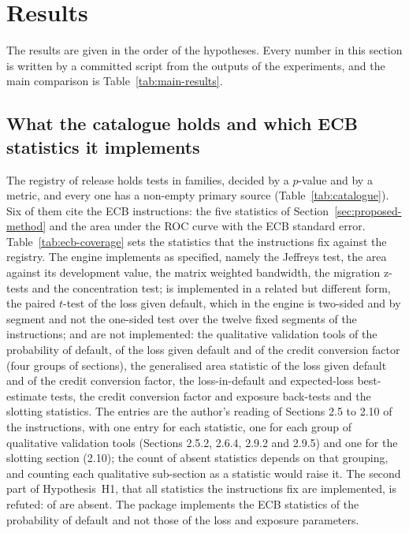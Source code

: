 \section{Results}
\label{sec:results}

The results are given in the order of the hypotheses. Every number in this section is written by a committed script from the outputs of the experiments, and the main comparison is Table~\ref{tab:main-results}.



\subsection{What the catalogue holds and which ECB statistics it implements}

The registry of release \inventoryVersion{} holds \testsTotal{} tests in \familiesTotal{} families, \pvalueTests{} decided by a $p$-value and \metricTests{} by a metric, and every one has a non-empty primary source (Table~\ref{tab:catalogue}). Six of them cite the ECB instructions: the five statistics of Section~\ref{sec:proposed-method} and the area under the ROC curve with the ECB standard error. Table~\ref{tab:ecb-coverage} sets the \ecbSections{} statistics that the instructions fix against the registry. The engine implements \ecbImpl{} as specified, namely the Jeffreys test, the area against its development value, the matrix weighted bandwidth, the migration z-tests and the concentration test; \ecbRelated{} is implemented in a related but different form, the paired $t$-test of the loss given default, which in the engine is two-sided and by segment and not the one-sided test over the twelve fixed segments of the instructions; and \ecbAbsent{} are not implemented: the qualitative validation tools of the probability of default, of the loss given default and of the credit conversion factor (four groups of sections), the generalised area statistic of the loss given default and of the credit conversion factor, the loss-in-default and expected-loss best-estimate tests, the credit conversion factor and exposure back-tests and the slotting statistics. The \ecbSections{} entries are the author's reading of Sections 2.5 to 2.10 of the instructions, with one entry for each statistic, one for each group of qualitative validation tools (Sections 2.5.2, 2.6.4, 2.9.2 and 2.9.5) and one for the slotting section (2.10); the count of absent statistics depends on that grouping, and counting each qualitative sub-section as a statistic would raise it. The second part of Hypothesis~H1, that all statistics the instructions fix are implemented, is refuted: \ecbAbsent{} of \ecbSections{} are absent. The package implements the ECB statistics of the probability of default and not those of the loss and exposure parameters.

